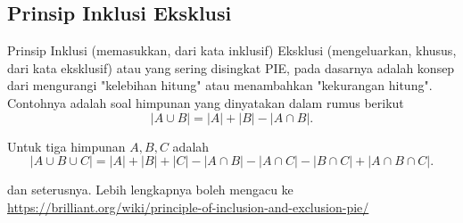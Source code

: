 \subsection{Prinsip Inklusi Eksklusi}
Prinsip Inklusi (memasukkan, dari kata inklusif) Eksklusi (mengeluarkan, khusus, dari kata eksklusif) atau yang sering disingkat PIE, pada dasarnya adalah konsep dari mengurangi "kelebihan hitung" atau menambahkan "kekurangan hitung". Contohnya adalah soal himpunan yang dinyatakan dalam rumus berikut
$$|A \cup B|=|A|+|B|-|A \cap B|.$$

Untuk tiga himpunan $A,B,C$ adalah
$$|A \cup B \cup C|=|A|+|B|+|C|-|A \cap B|-|A \cap C|-|B \cap C|+|A \cap B \cap C|.$$

dan seterusnya. Lebih lengkapnya boleh mengacu ke \href{https://brilliant.org/wiki/principle-of-inclusion-and-exclusion-pie/}{https://brilliant.org/wiki/principle-of-inclusion-and-exclusion-pie/}



 
